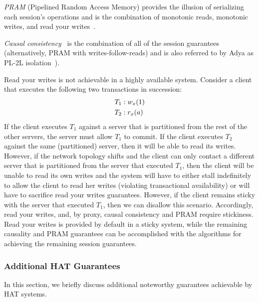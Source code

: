 \vspace{.5em}\noindent\textit{{PRAM}} (Pipelined Random Access
Memory) provides the illusion of serializing each session's operations
and is the combination of monotonic reads, monotonic writes, and read
your writes~\cite{herlihy-art}.

\vspace{.5em}\noindent\textit{{Causal
    consistency}}~\cite{causalmemory} is the combination of all of the
session guarantees~\cite{sessiontocausal} (alternatively, PRAM with
writes-follow-reads) and is also referred to by Adya as PL-2L
isolation~\cite{adya}).\vspace{.5em}


Read your writes is not achievable in a highly available
system. Consider a client that executes the following two transactions
in succession:
\begin{align*}
\small\vspace{-.5em}
T_1 &: w_x(1)
\\T_2 &: r_x(a)\vspace{-.5em}
\end{align*}
If the client executes $T_1$ against a server that is partitioned from
the rest of the other servers, the server must allow $T_1$ to
commit. If the client executes $T_2$ against the same (partitioned)
server, then it will be able to read its writes. However, if the
network topology shifts and the client can only contact a different
server that is partitioned from the server that executed $T_1$, then
the client will be unable to read its own writes and the system will
have to either stall indefinitely to allow the client to read her
writes (violating transactional availability) or will have to
sacrifice read your writes guarantees. However, if the client remains
sticky with the server that executed $T_1$, then we can disallow this
scenario. Accordingly, read your writes, and, by proxy, causal
consistency and PRAM require stickiness. Read your writes is provided
by default in a sticky system, while the remaining causality and PRAM
guarantees can be accomplished with the algorithms for achieving the
remaining session guarantees.

\subsubsection{Additional HAT Guarantees}

In this section, we briefly discuss additional noteworthy guarantees
achievable by HAT systems.

